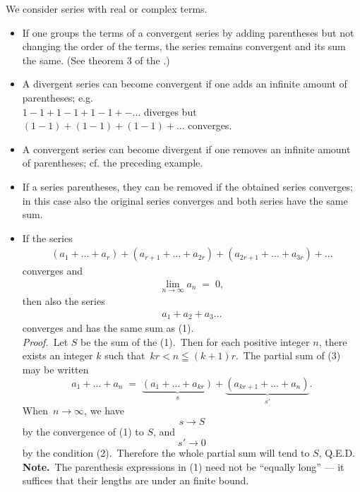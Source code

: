 \documentclass[12pt]{article}
\theoremstyle{definition}
\begin{document}
We consider series with real or complex terms.

\begin{itemize}

\item If one groups the terms of a convergent series by adding parentheses but not changing the order of the terms, the series remains convergent and its sum the same. (See theorem 3 of the .)

\item A divergent series can become convergent if one adds an infinite amount of parentheses; e.g.\\
$1-1+1-1+1-1+-\ldots$ diverges but $(1-1)+(1-1)+(1-1)+\ldots$ converges.

\item A convergent series can become divergent if one removes an infinite amount of parentheses; cf. the preceding example.

\item If a series  parentheses, they can be removed if the obtained series converges; in this case also the original series converges and both series have the same sum.

\item If the series
\begin{align}
(a_1+\ldots+a_r)+(a_{r+1}+\ldots+a_{2r})+(a_{2r+1}+\ldots+a_{3r})+\ldots
\end{align}
converges and
\begin{align}
\lim_{n\to\infty}a_n \;=\; 0,
\end{align}
then also the series 
\begin{align}
a_1+a_2+a_3\ldots
\end{align}
converges and has the same sum as (1).\\

\emph{Proof.}\, Let $S$ be the sum of the (1).\, Then for each positive integer $n$, there exists an integer $k$ such that\, $kr < n \leqq (k\!+\!1)r$.\, The partial sum of (3) may be written
$$a_1+\ldots+a_n \;=\; \underbrace{(a_1+\ldots+a_{kr})}_{s}+\underbrace{(a_{kr+1}+\ldots+a_n)}_{s'}.$$
When\, $n \to \infty$, we have
$$s \to S$$
by the convergence of (1) to $S$, and
$$s' \to 0$$
by the condition (2).\, Therefore the whole partial sum will tend to $S$, Q.E.D.\\


\textbf{Note.}\, The parenthesis expressions in (1) need not be ``equally long'' --- it suffices that their lengths are under an finite bound.

\end{itemize}

\end{document}
